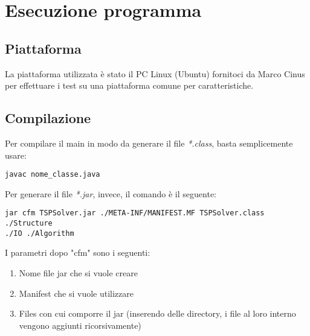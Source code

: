 \chapter*{Esecuzione programma}
\label{cha_esecuzione}

\section*{Piattaforma}
\label{sec_piattaforma}
La piattaforma utilizzata è stato il PC Linux (Ubuntu) fornitoci da Marco Cinus per effettuare i test su una piattaforma comune per caratteristiche.

\section*{Compilazione}
\label{sec_comp}
Per compilare il main in modo da generare il file \emph{*.class}, basta semplicemente usare:
\begin{lstlisting}
javac nome_classe.java
\end{lstlisting}
Per generare il file \emph{*.jar}, invece, il comando è il seguente:
\begin{lstlisting}
jar cfm TSPSolver.jar ./META-INF/MANIFEST.MF TSPSolver.class ./Structure 
./IO ./Algorithm
\end{lstlisting}
I parametri dopo "cfm" sono i seguenti:
\begin{enumerate}
	\item Nome file jar che si vuole creare
	\item Manifest che si vuole utilizzare
	\item Files con cui comporre il jar (inserendo delle directory, i file al loro interno vengono aggiunti ricorsivamente)
\end{enumerate}
	
